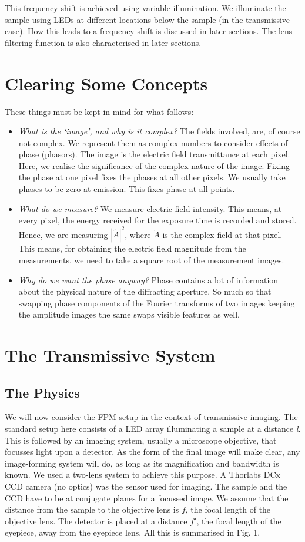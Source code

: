 \documentclass[11pt,a4paper,journal]{IEEEtran}
\begin{document}
This frequency shift is achieved using variable illumination. We illuminate the sample using LEDs at different locations below the sample (in the transmissive case). How this leads to a frequency shift is discussed in later sections. The lens filtering function is also characterised in later sections.

\section{Clearing Some Concepts}
These things must be kept in mind for what follows:
\begin{itemize}
\item \textit{What is the `image', and why is it complex?} The fields involved, are, of course not complex. We represent them as complex numbers to consider effects of phase (phasors). The image is the electric field transmittance at each pixel. Here, we realise the significance of the complex nature of the image. Fixing the phase at one pixel fixes the phases at all other pixels. We usually take phases to be zero at emission. This fixes phase at all points.
\item \textit{What do we measure?} We measure electric field intensity. This means, at every pixel, the energy received for the exposure time is recorded and stored. Hence, we are measuring $|\tilde{A}|^2$, where $\tilde{A}$ is the complex field at that pixel. This means, for obtaining the electric field magnitude from the measurements, we need to take a square root of the measurement images.
\item \textit{Why do we want the phase anyway?} Phase contains a lot of information about the physical nature of the diffracting aperture. So much so that swapping phase components of the Fourier transforms of two images keeping the amplitude images the same swaps visible features as well.
\end{itemize}

\section{The Transmissive System}

\subsection{The Physics}
We will now consider the FPM setup in the context of transmissive imaging. The standard setup here consists of a LED array illuminating a sample at a distance \textit{l}. This is followed by an imaging system, usually a microscope objective, that focusses light upon a detector. As the form of the final image will make clear, any image-forming system will do, as long as its magnification and bandwidth is known. We used a two-lens system to achieve this purpose. A Thorlabs DCx CCD camera (no optics) was the sensor used for imaging. The sample and the CCD have to be at conjugate planes for a focussed image. We assume that the distance from the sample to the objective lens is $f$, the focal length of the objective lens. The detector is placed at a distance $f'$, the focal length of the eyepiece, away from the eyepiece lens. All this is summarised in Fig. 1.
\end{document}
